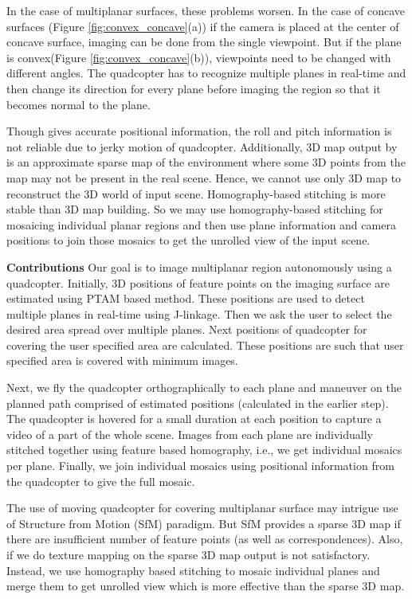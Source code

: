 In the case of multiplanar surfaces, these problems worsen. In the case of concave
surfaces (Figure \ref{fig:convex_concave}(a)) if the camera is placed at the
center of concave surface, imaging can be done from the single viewpoint.
But if the plane is convex(Figure \ref{fig:convex_concave}(b)), viewpoints need
to be changed with different angles. The quadcopter has to recognize multiple planes
in real-time and then change its direction for every plane before imaging the
region so that it becomes normal to the plane.

Though \cite{engel} gives accurate positional information, the roll and
pitch information is not reliable due to jerky motion of quadcopter.
Additionally, 3D map output by \cite{engel} is an approximate sparse map of the
environment where some 3D points from the map may not be present in the real
scene. Hence, we cannot use only 3D map to reconstruct the 3D world of input
scene. Homography-based stitching  is more stable than 3D map building. So we
may use homography-based stitching for  mosaicing individual planar regions and then
use plane information and camera positions to join those mosaics to get
the unrolled view of the input scene.

\textbf{Contributions}
Our goal is to image multiplanar region autonomously using a quadcopter. Initially,
3D positions of feature points on the imaging surface are estimated using PTAM
based method. These positions are used to detect multiple planes in real-time
using J-linkage. Then we ask the user to select the desired area spread over
multiple planes. Next positions of quadcopter for covering the user specified
area are calculated. These positions are such that user specified area is
covered with minimum images. 

Next, we fly the quadcopter orthographically to each plane and maneuver on
the planned path comprised of estimated positions (calculated in the earlier step).
The quadcopter is hovered for a small duration at each position to capture a video of a
part of the whole scene. Images from each plane are individually stitched together
using feature based homography, i.e., we get individual mosaics per plane. Finally, we join
individual mosaics using positional information from the quadcopter to give the
full mosaic.

The use of moving quadcopter for covering multiplanar surface may intrigue use
of Structure from Motion (SfM) paradigm. But SfM provides a sparse 3D map if
there are insufficient number of feature points (as well as correspondences).
Also, if we do texture mapping on the sparse 3D map output is not satisfactory.
Instead, we use homography based stitching to mosaic individual planes and merge
them to get unrolled view which is more effective than the sparse 3D map.



